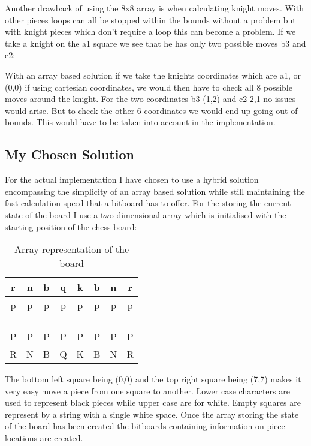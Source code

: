 \documentclass[11pt]{report}
\begin{document}
Another drawback of using the 8x8 array is when calculating knight moves. With other pieces loops can all be stopped within the bounds without a problem but with knight pieces which don't require a loop this can become a problem. If we take a knight on the a1 square we see that he has only two possible moves b3 and c2:

\newgame
{}
\showboard

With an array based solution if we take the knights coordinates which are a1, or (0,0) if using cartesian coordinates, we would then have to check all 8 possible moves around the knight. For the two coordinates b3 (1,2) and c2 2,1 no issues would arise. But to check the other 6 coordinates we would end up going out of bounds. This would have to be taken into account in the implementation.


\subsection{My Chosen Solution}

For the actual implementation I have chosen to use a hybrid solution encompassing the simplicity of an array based solution while still maintaining the fast calculation speed that a bitboard has to offer. For the storing the current state of the board I use a two dimensional array which is initialised with the starting position of the chess board:

\begin{table}[H]
\centering
\begin{tabular}{|c|c|c|c|c|c|c|c|}
\hline
r   & n & b & q & k & b & n & r \\ \hline
p   & p & p & p & p & p & p & p \\ \hline
    &   &   &   &   &   &   &   \\ \hline
    &   &   &   &   &   &   &   \\ \hline
    &   &   &   &   &   &   &   \\ \hline
    &   &   &   &   &   &   &   \\ \hline
  P & P & P & P & P & P & P & P \\ \hline
R   & N & B & Q & K & B & N & R \\ \hline
\end{tabular}
\caption{Array representation of the board}
\end{table}

The bottom left square being (0,0) and the top right square being (7,7) makes it very easy move a piece from one square to another. Lower case characters are used to represent black pieces while upper case are for white. Empty squares are represent by a string with a single white space. Once the array storing the state of the board has been created the bitboards containing information on piece locations are created. \newline
\end{document}
